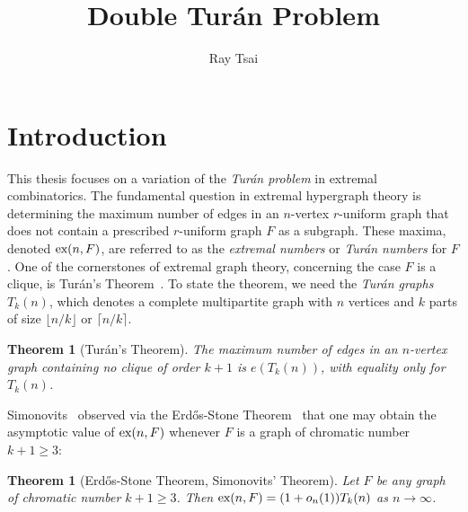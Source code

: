 \documentclass[12pt]{article}
\title{Double Turán Problem}
\author{Ray Tsai}
\newcounter{foo}
\newtheorem{oldtheorem}[foo]{Theorem}
\newcommand*{\ex}{\textnormal{ex}}
\begin{document}
\maketitle



\tableofcontents

\newpage

\section{Introduction}

This thesis focuses on a variation of the \textit{Turán problem} in extremal combinatorics.  The fundamental question in extremal hypergraph theory is determining the maximum number of edges in an $n$-vertex $r$-uniform graph that does not contain a prescribed $r$-uniform graph $F$ as a subgraph. These maxima, denoted $\ex(n, F)$, are referred to as the \textit{extremal numbers} or \textit{Turán numbers} for $F$. One of the cornerstones of extremal graph theory, concerning the case $F$ is a clique, is Tur\'{a}n's Theorem~\cite{Turan1941}. To state the theorem, we need the \textit{Tur\'{a}n graphs} $T_k(n)$, which denotes a complete multipartite graph with $n$ vertices and $k$ parts of size $\lfloor n/k\rfloor$ or $\lceil n/k\rceil$. 

\begin{oldtheorem}[Tur\'{a}n's Theorem]\label{thm:turan}
The maximum number of edges in an $n$-vertex graph containing no clique of order $k + 1$ is $e(T_k(n))$, 
with equality only for $T_k(n)$.
\end{oldtheorem}

Simonovits~\cite{ErdosSimonovits1966} observed via the Erd\H{o}s-Stone Theorem~\cite{ErdosStone1946} that one may obtain the asymptotic value of $\ex(n,F)$ whenever $F$ is a graph of chromatic number $k + 1\geq 3$:

\begin{oldtheorem}[Erd\H{o}s-Stone Theorem, Simonovits' Theorem]\label{thm:ess}
Let $F$ be any graph of chromatic number $k + 1 \geq 3$. Then $\ex(n,F) = (1 + o_n(1))T_k(n)$ as $n \rightarrow \infty$.
\end{oldtheorem}
\end{document}
